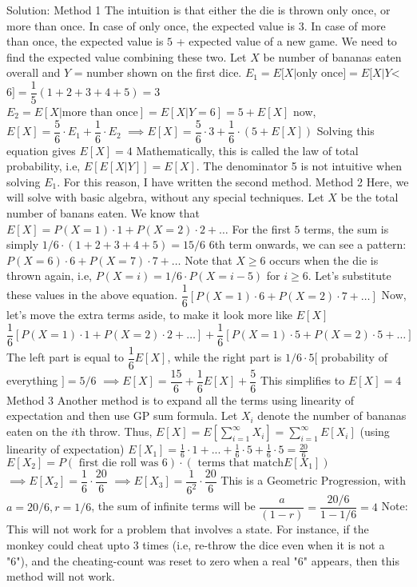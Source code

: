 \begin{enumerate}
Solution: Method 1
The intuition is that either the die is thrown only once, or more than once. In case of only once, the expected value is $3$.
In case of more than once, the expected value is $5$ + expected value of a new game. We need to find the expected value combining these two.
Let $X$ be number of bananas eaten overall  and $Y$ = number shown on the first dice.
$E_1 = E[X | \text{only once}] = E[X | Y $<$ 6] = \dfrac{1}{5}(1+2+3+4+5) = 3$
$E_2 = E[ X | \text{more than once}] = E[X | Y=6] = 5 + E[X]$
now, $E[X] =  \dfrac{5}{6}\cdot E_1 + \dfrac{1}{6} \cdot E_2$
$\implies E[X] = \dfrac{5}{6} \cdot 3 + \dfrac{1}{6} \cdot (5 + E[X])$
Solving this equation gives $E[X] = 4$
Mathematically, this is called the law of total probability, i.e, $E[ E[X|Y] ] = E[X]$.
The denominator 5 is not intuitive when solving $E_1$. For this reason, I have written the second method.
Method 2
Here, we will solve with basic algebra, without any special techniques.
Let $X$ be the total number of banans eaten.
We know that $E[X]= P(X=1)\cdot 1 + P(X=2) \cdot 2 + \ldots$
For the first $5$ terms, the sum is simply $1/6 \cdot (1+2+3+4+5) = 15/6$
$6$th term onwards, we can see a pattern:
$P(X=6)  \cdot 6 + P(X=7) \cdot 7 + \ldots$
Note that $X\ge 6$ occurs when the die is thrown again, i.e, $P(X=i) = 1/6 \cdot P(X=i - 5)$ for $i\ge 6$.
Let's substitute these values in the above equation.
$ \dfrac{1}{6} [ P(X=1)  \cdot 6 + P(X=2) \cdot 7 + \ldots  ]$
Now, let's move the extra terms aside, to make it look more like $E[X]$
$ \dfrac{1}{6}  [ P(X=1) \cdot 1 + P(X=2) \cdot 2 + \ldots ]  + \dfrac{1}{6} [P(X=1) \cdot 5 + P(X=2) \cdot 5 + \ldots]$
The left part is equal to $\dfrac{1}{6} E[X]$, while the right part is $1/6 \cdot 5 [$ probability of everything $] = 5/6 $
$\implies  E[X] = \dfrac{15}{6} + \dfrac{1}{6}E[X] + \dfrac{5}{6}$
This simplifies to $E[X] = 4$
Method 3
Another method is to expand all the terms using linearity of expectation and then use GP sum formula.
Let $X_i$ denote the number of bananas eaten on the $i$th throw.
Thus, $E[X] = E[\sum_{i=1}^{\infty} X_i] = \sum_{i=1}^{\infty} E[X_i]$ (using linearity of expectation)
$E[X_1] = \frac{1}{6} \cdot 1 + ... + \frac{1}{6}  \cdot 5 + \frac{1}{6}  \cdot 5 = \frac{20}{6}$
$E[X_2] = P(\text{ first die roll was 6} ) \cdot (\text{ terms that match} E[X_1])$
$\implies E[X_2] = \dfrac{1}{6} \cdot \dfrac{20}{6}$
$\implies E[X_3] = \dfrac{1}{6^2} \cdot \dfrac{20}{6}$
This is a Geometric Progression, with $a = 20/6, r=1/6$, the sum of infinite terms will be $\dfrac{a}{(1-r)} = \dfrac{20/6}{1-1/6} = 4$
Note: This will not work for a problem that involves a state. For instance, if the monkey could cheat upto 3 times (i.e, re-throw the dice even when it is not a "6"), and the cheating-count was reset to zero when a real "6" appears, then this method will not work.




\end{enumerate}
